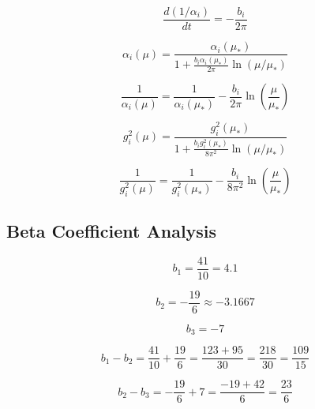 \documentclass[11pt,a4paper]{article}
\theoremstyle{definition}
\begin{document}
\begin{equation}
\label{eq:rg_ext_2}
\frac{d(1/\alpha_i)}{dt} = -\frac{b_i}{2\pi}
\end{equation}

\begin{equation}
\label{eq:rg_ext_3}
\alpha_i(\mu) = \frac{\alpha_i(\mu_*)}{1 + \frac{b_i\alpha_i(\mu_*)}{2\pi}\ln(\mu/\mu_*)}
\end{equation}

\begin{equation}
\label{eq:rg_ext_4}
\frac{1}{\alpha_i(\mu)} = \frac{1}{\alpha_i(\mu_*)} - \frac{b_i}{2\pi}\ln\left(\frac{\mu}{\mu_*}\right)
\end{equation}

\begin{equation}
\label{eq:rg_ext_5}
g_i^2(\mu) = \frac{g_i^2(\mu_*)}{1 + \frac{b_i g_i^2(\mu_*)}{8\pi^2}\ln(\mu/\mu_*)}
\end{equation}

\begin{equation}
\label{eq:rg_ext_6}
\frac{1}{g_i^2(\mu)} = \frac{1}{g_i^2(\mu_*)} - \frac{b_i}{8\pi^2}\ln\left(\frac{\mu}{\mu_*}\right)
\end{equation}

\subsection{Beta Coefficient Analysis}
\label{subsec:beta_extended}

\begin{equation}
\label{eq:beta_ext_1}
b_1 = \frac{41}{10} = 4.1
\end{equation}

\begin{equation}
\label{eq:beta_ext_2}
b_2 = -\frac{19}{6} \approx -3.1667
\end{equation}

\begin{equation}
\label{eq:beta_ext_3}
b_3 = -7
\end{equation}

\begin{equation}
\label{eq:beta_ext_4}
b_1 - b_2 = \frac{41}{10} + \frac{19}{6} = \frac{123 + 95}{30} = \frac{218}{30} = \frac{109}{15}
\end{equation}

\begin{equation}
\label{eq:beta_ext_5}
b_2 - b_3 = -\frac{19}{6} + 7 = \frac{-19 + 42}{6} = \frac{23}{6}
\end{equation}
\end{document}
